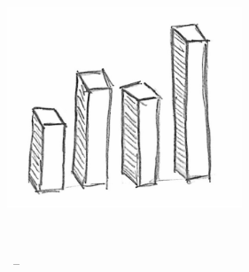 
\begin{titlepage}

\begin{addmargin}[-1cm]{-3cm}
\begin{center}
\large

\hfill
\vfill

\begingroup
\color{Maroon}{\LARGE\spacedallcaps{\myTitle}}\\ \bigskip %
\endgroup

\spacedlowsmallcaps{\myName} %

\vfill

\includegraphics[width=7cm]{images/bars} \\ \medskip %

\mySubtitle \\ \medskip %

\myTime\ -- \myVersion %

\vfill

\end{center}
\end{addmargin}

\end{titlepage}
